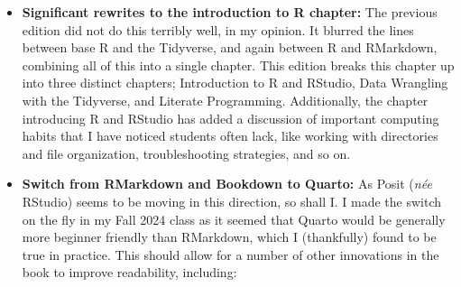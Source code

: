\documentclass[
  letterpaper,
]{book}
\providecommand{\tightlist}{%
  \setlength{\itemsep}{0pt}\setlength{\parskip}{0pt}}\usepackage{longtable,booktabs,array}
\begin{document}
\begin{itemize}
\tightlist
\item
  \textbf{Significant rewrites to the introduction to R chapter:} The
  previous edition did not do this terribly well, in my opinion. It
  blurred the lines between base R and the Tidyverse, and again between
  R and RMarkdown, combining all of this into a single chapter. This
  edition breaks this chapter up into three distinct chapters;
  Introduction to R and RStudio, Data Wrangling with the Tidyverse, and
  Literate Programming. Additionally, the chapter introducing R and
  RStudio has added a discussion of important computing habits that I
  have noticed students often lack, like working with directories and
  file organization, troubleshooting strategies, and so on.
\item
  \textbf{Switch from RMarkdown and Bookdown to Quarto:} As Posit
  (\emph{née} RStudio) seems to be moving in this direction, so shall I.
  I made the switch on the fly in my Fall 2024 class as it seemed that
  Quarto would be generally more beginner friendly than RMarkdown, which
  I (thankfully) found to be true in practice. This should allow for a
  number of other innovations in the book to improve readability,
  including:


\end{itemize}
\end{document}
